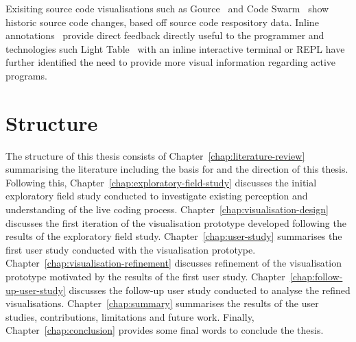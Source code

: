 \more

Exisiting source code visualisations such as Gource~\cite{Caudwell2010} and Code Swarm~\cite{Ogawa2012} show historic source code changes, based off source code respository data. Inline annotations~\cite{Swift2013} provide direct feedback directly useful to the programmer and technologies such Light Table~\cite{Kodowa2014} with an inline interactive terminal or \ac{REPL} have further identified the need to provide more visual information regarding active programs.

\section{Structure}

The structure of this thesis consists of Chapter~\ref{chap:literature-review} summarising the literature including the basis for and the direction of this thesis. Following this, Chapter~\ref{chap:exploratory-field-study} discusses the initial exploratory field study conducted to investigate existing perception and understanding of the live coding process. Chapter~\ref{chap:visualisation-design} discusses the first iteration of the visualisation prototype developed following the results of the exploratory field study. Chapter~\ref{chap:user-study} summarises the first user study conducted with the visualisation prototype. Chapter~\ref{chap:visualisation-refinement} discusses refinement of the visualisation prototype motivated by the results of the first user study. Chapter~\ref{chap:follow-up-user-study} discusses the follow-up user study conducted to analyse the refined visualisations. Chapter~\ref{chap:summary} summarises the results of the user studies, contributions, limitations and future work. Finally, Chapter~\ref{chap:conclusion} provides some final words to conclude the thesis.

